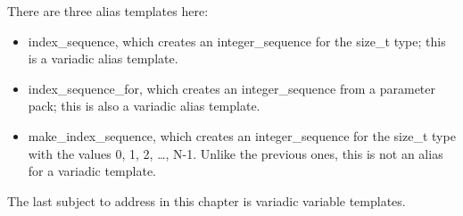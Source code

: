 There are three alias templates here:

\begin{itemize}
\item
index\_sequence, which creates an integer\_sequence for the size\_t type; this is a variadic alias template.

\item
index\_sequence\_for, which creates an integer\_sequence from a parameter pack; this is also a variadic alias template.

\item
make\_index\_sequence, which creates an integer\_sequence for the size\_t type with the values 0, 1, 2, …, N-1. Unlike the previous ones, this is not an alias for a variadic template.
\end{itemize}

The last subject to address in this chapter is variadic variable templates.










